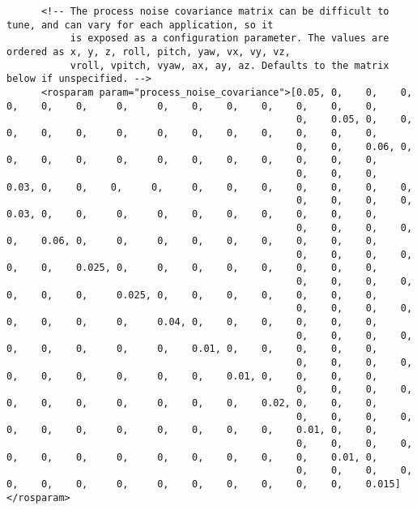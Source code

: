 \begin{verbatim}
      <!-- The process noise covariance matrix can be difficult to tune, and can vary for each application, so it
           is exposed as a configuration parameter. The values are ordered as x, y, z, roll, pitch, yaw, vx, vy, vz,
           vroll, vpitch, vyaw, ax, ay, az. Defaults to the matrix below if unspecified. -->
      <rosparam param="process_noise_covariance">[0.05, 0,    0,    0,    0,    0,    0,     0,     0,    0,    0,    0,    0,    0,    0,
                                                  0,    0.05, 0,    0,    0,    0,    0,     0,     0,    0,    0,    0,    0,    0,    0,
                                                  0,    0,    0.06, 0,    0,    0,    0,     0,     0,    0,    0,    0,    0,    0,    0,
                                                  0,    0,    0,    0.03, 0,    0,    0,     0,     0,    0,    0,    0,    0,    0,    0,
                                                  0,    0,    0,    0,    0.03, 0,    0,     0,     0,    0,    0,    0,    0,    0,    0,
                                                  0,    0,    0,    0,    0,    0.06, 0,     0,     0,    0,    0,    0,    0,    0,    0,
                                                  0,    0,    0,    0,    0,    0,    0.025, 0,     0,    0,    0,    0,    0,    0,    0,
                                                  0,    0,    0,    0,    0,    0,    0,     0.025, 0,    0,    0,    0,    0,    0,    0,
                                                  0,    0,    0,    0,    0,    0,    0,     0,     0.04, 0,    0,    0,    0,    0,    0,
                                                  0,    0,    0,    0,    0,    0,    0,     0,     0,    0.01, 0,    0,    0,    0,    0,
                                                  0,    0,    0,    0,    0,    0,    0,     0,     0,    0,    0.01, 0,    0,    0,    0,
                                                  0,    0,    0,    0,    0,    0,    0,     0,     0,    0,    0,    0.02, 0,    0,    0,
                                                  0,    0,    0,    0,    0,    0,    0,     0,     0,    0,    0,    0,    0.01, 0,    0,
                                                  0,    0,    0,    0,    0,    0,    0,     0,     0,    0,    0,    0,    0,    0.01, 0,
                                                  0,    0,    0,    0,    0,    0,    0,     0,     0,    0,    0,    0,    0,    0,    0.015]</rosparam>


\end{verbatim}
